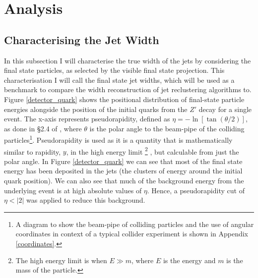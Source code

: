 \documentclass[a4paper,11pt, onecolumn]{article}
\begin{document}
\section{Analysis}
\subsection{Characterising the Jet Width} \label{ss fs}
  
  In this subsection I will characterise the true width of the jets by considering the final state particles, as selected by the visible final
  state projection. This characterisation I will call the final state jet widths, which will be used as a benchmark to compare the width reconstruction of
  jet reclustering algorithms to.
  Figure \ref{detector_quark} shows the positional distribution of final-state particle energies alongside the position of the
  initial quarks from the $Z'$ decay for a single event. The x-axis represents pseudorapidity, defined as 
  $\eta = -\ln\left[\tan\left(\theta /2 \right)\right]$, as done in \S2.4 of \cite{wong}, where $\theta$ is the polar angle to the beam-pipe of the colliding 
  particles\footnote{A diagram to show the beam-pipe of colliding particles and the use of angular coordinates in context 
  of a typical collider experiment is shown in Appendix \ref{coordinates}.}. Pseudorapidity is used as it is a
  quantity that is mathematically similar to rapidity, $y$, in the high energy limit
  \footnote{The high energy limit is when $E \gg m$, where $E$ is the energy and $m$ is the mass of the particle.} \cite{pseudorapidity},
  but calculable from just the polar angle. In Figure \ref{detector_quark} 
  we can see that most of the final state energy has been deposited in the jets (the clusters of energy around the initial quark position). We can also see that much 
  of the background energy from the underlying event is at high absolute values of $\eta$. Hence, a pseudorapidity cut of $\eta < |2|$ was applied to reduce this background.
\end{document}

